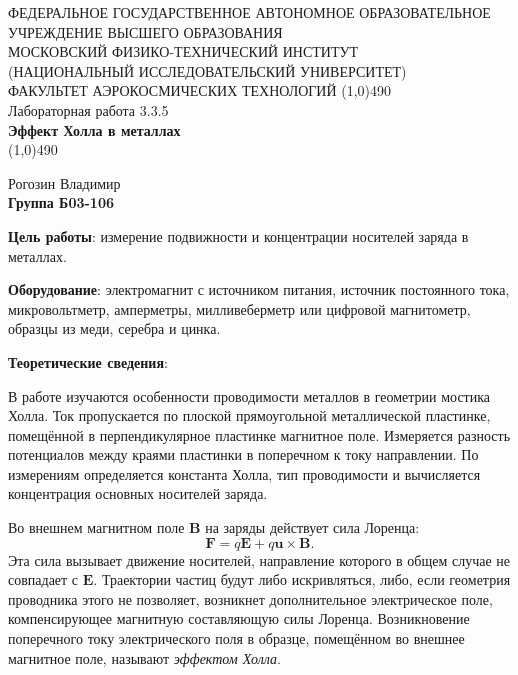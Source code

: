 \documentclass[a4paper,12pt]{article}
\begin{document}
\begin{titlepage}
\begin{center}
\large{\small ФЕДЕРАЛЬНОЕ ГОСУДАРСТВЕННОЕ АВТОНОМНОЕ ОБРАЗОВАТЕЛЬНОЕ\\ УЧРЕЖДЕНИЕ ВЫСШЕГО ОБРАЗОВАНИЯ \\ МОСКОВСКИЙ ФИЗИКО-ТЕХНИЧЕСКИЙ ИНСТИТУТ\\ (НАЦИОНАЛЬНЫЙ ИССЛЕДОВАТЕЛЬСКИЙ УНИВЕРСИТЕТ)\\ ФАКУЛЬТЕТ АЭРОКОСМИЧЕСКИХ ТЕХНОЛОГИЙ}
\vfill
\line(1,0){490}\\[1mm]
\huge{Лабораторная работа 3.3.5}\\
\huge\textbf{Эффект Холла в металлах}\\
\line(1,0){490}\\[1mm]
\vfill
\begin{flushright}
\normalsize{Рогозин Владимир}\\
\normalsize{\textbf{Группа Б03-106}}\\
\end{flushright}
\end{center}
\end{titlepage}


\textbf{Цель работы}: 
измерение подвижности и концентрации носителей заряда в металлах.

\textbf{Оборудование}:
электромагнит с источником питания, источник постоянного тока, микровольтметр, амперметры, милливеберметр или цифровой магнитометр, образцы из меди, серебра и цинка.

\textbf{Теоретические сведения}: 

В работе изучаются особенности проводимости металлов в геометрии мостика Холла. Ток пропускается по плоской прямоугольной металлической пластинке, помещённой в перпендикулярное пластинке магнитное поле. Измеряется разность потенциалов между краями пластинки в поперечном к току направлении. По измерениям определяется константа Холла, тип проводимости и вычисляется концентрация основных носителей заряда.

Во внешнем магнитном поле $\mathbf{B}$ на заряды действует сила Лоренца:
\[\mathbf{F} = q\mathbf{E} + q \mathbf{u} \times \mathbf{B}.\]
Эта сила вызывает движение носителей, направление которого в общем
случае не совпадает с $\mathbf{E}$. Траектории частиц будут либо искривляться, либо, если геометрия проводника этого не позволяет, возникнет дополнительное электрическое поле, компенсирующее магнитную составляющую силы Лоренца. Возникновение поперечного току электрического поля в образце, помещённом во внешнее магнитное поле, называют \textit{эффектом Холла}.
\end{document}
